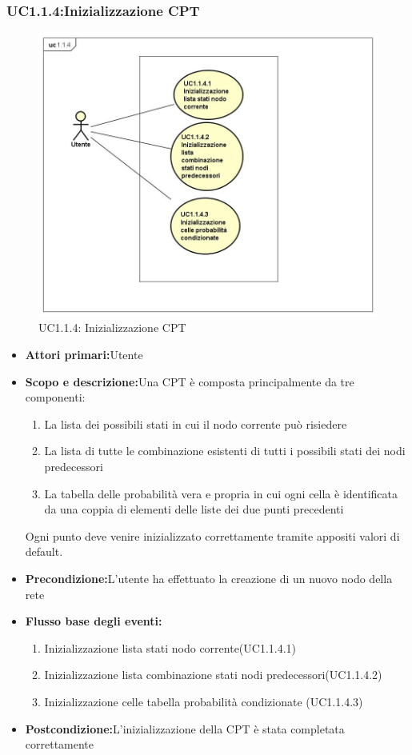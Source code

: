 \subsubsection{UC1.1.4:Inizializzazione CPT}
\begin{figure} [H]
	\centering
	\includegraphics[scale=0.45]{Img/UC1-1-4}
	\caption{UC1.1.4: Inizializzazione CPT}\label{}
\end{figure}
\begin{itemize}
	\item{\textbf{Attori primari:}Utente}
	\item{\textbf{Scopo e descrizione:}Una CPT è composta principalmente da tre componenti:
		\begin{enumerate}
			\item{La lista dei possibili stati in cui il nodo corrente può risiedere}
			\item{La lista di tutte le combinazione esistenti di tutti i possibili stati dei nodi predecessori}
			\item{La tabella delle probabilità vera e propria in cui ogni cella è identificata da una coppia di elementi delle liste dei due punti precedenti}
		\end{enumerate}			
		Ogni punto deve venire inizializzato correttamente tramite appositi valori di default.
	}
	\item{\textbf{Precondizione:}L'utente ha effettuato la creazione di un nuovo nodo della rete}
	\item{\textbf{Flusso base degli eventi:}}
	\begin{enumerate}
		\item{Inizializzazione lista stati nodo corrente(UC1.1.4.1)}
		\item{Inizializzazione lista combinazione stati nodi predecessori(UC1.1.4.2)}
		\item{Inizializzazione celle tabella probabilità condizionate (UC1.1.4.3)}
	\end{enumerate}
	\item{\textbf{Postcondizione:}L'inizializzazione della CPT è stata completata correttamente}
\end{itemize}
